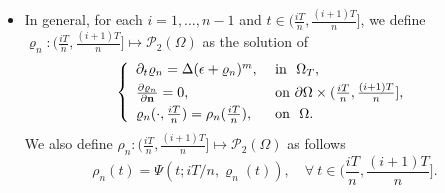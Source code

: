 \documentclass{amsart}
\numberwithin{equation}{section}
\begin{document}
\begin{itemize}

\item In general, for each $i=1, \ldots, n-1$ and $t\in (\frac{iT}{n} ,\frac{(i+1)T}{n}]$, we define $\varrho_n:(\frac{iT}{n} ,\frac{(i+1)T}{n}]\mapsto \mathcal{P}_{2}(\Omega)$ as the solution of
\begin{equation*}\label{eq 3 : splitting}
  \left\{
  \begin{array}{ll}
  \partial_t \varrho_n =   \Delta (\epsilon +\varrho_n)^m, & \text{ in } \ \Omega_{T},  \vspace{1mm}\\
  \frac{\partial \varrho_n}{\partial \mathbf{n}} = 0, & \text{ on } \partial \Omega \times (\frac{iT}{n}, \frac{(i+1)T}{n}],  \vspace{1mm}\\
 \varrho_n(\cdot, \frac{iT}{n})=\rho_n( \frac{iT}{n}), & \text{ on } \ \Omega.
  \end{array}
  \right.
\end{equation*}
We also define  $\rho_n:(\frac{iT}{n} ,\frac{(i+1)T}{n}]\mapsto
\mathcal{P}_{2}(\Omega)$ as follows
\begin{equation*}
\rho_n(t)= \Psi(t; iT/n, \varrho_n(t)), \quad \forall ~ t \in
(\frac{iT}{n} ,\frac{(i+1)T}{n}].
\end{equation*}
\end{itemize}
\end{document}

